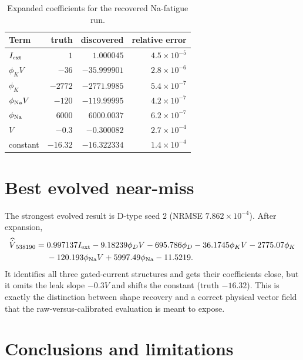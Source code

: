 \documentclass[10pt]{article}
\begin{document}
\begin{table}[h]
\centering
\caption{Expanded coefficients for the recovered Na-fatigue run.}
\small
\begin{tabular}{lrrr}
\toprule
Term & truth & discovered & relative error \\
\midrule
$I_{\rm ext}$ & $1$ & $1.000045$ & $4.5\times10^{-5}$ \\
$\phi_KV$ & $-36$ & $-35.999901$ & $2.8\times10^{-6}$ \\
$\phi_K$ & $-2772$ & $-2771.9985$ & $5.4\times10^{-7}$ \\
$\phi_{\rm Na}V$ & $-120$ & $-119.99995$ & $4.2\times10^{-7}$ \\
$\phi_{\rm Na}$ & $6000$ & $6000.0037$ & $6.2\times10^{-7}$ \\
$V$ & $-0.3$ & $-0.300082$ & $2.7\times10^{-4}$ \\
constant & $-16.32$ & $-16.322334$ & $1.4\times10^{-4}$ \\
\bottomrule
\end{tabular}
\end{table}

\section{Best evolved near-miss}

The strongest evolved result is D-type seed 2 (NRMSE $7.862\!\times\!10^{-4}$).
After expansion,
\begin{align}
\widehat{\dot V}_{538190} ={}&0.997137 I_{\rm ext}-9.18239\phi_DV-695.786\phi_D
-36.1745\phi_KV-2775.07\phi_K \notag\\
&-120.193\phi_{\rm Na}V+5997.49\phi_{\rm Na}-11.5219.
\end{align}
It identifies all three gated-current structures and gets their coefficients close, but it omits the
leak slope $-0.3V$ and shifts the constant (truth $-16.32$). This is exactly the distinction between
shape recovery and a correct physical vector field that the raw-versus-calibrated evaluation is meant
to expose.

\section{Conclusions and limitations}
\end{document}
